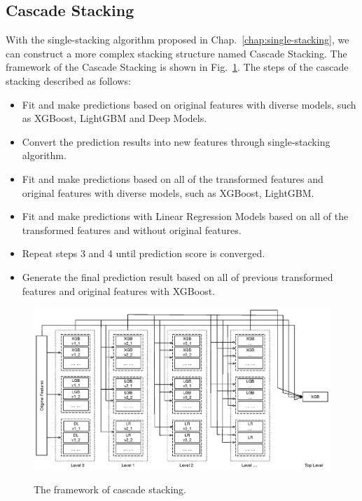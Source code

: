 \documentclass[12pt]{article}
\begin{document}
\subsection{Cascade Stacking}

With the single-stacking algorithm proposed in Chap.~{\ref{chap:single-stacking}}, we can construct a more complex stacking structure named Cascade Stacking. The framework of the Cascade Stacking is shown in Fig.~{\ref{fig:cascade-stacking}}. The steps of the cascade stacking described as follows:

\begin{itemize}
\label{alg:cascade-stacking}
\item[1.] Fit and make predictions based on original features with diverse models, such as XGBoost, LightGBM and Deep Models.
\item[2.] Convert the prediction results into new features through single-stacking algorithm.
\item[3.] Fit and make predictions based on all of the transformed features and original features with diverse models, such as XGBoost, LightGBM.
\item[4.] Fit and make predictions with Linear Regression Models based on all of the transformed features and without original features.
\item[5.] Repeat steps 3 and 4 until prediction score is converged.
\item[6.] Generate the final prediction result based on all of previous transformed features and original features with XGBoost.
\end{itemize}


\begin{figure}[ht]
  \centering
  \includegraphics[width=1.0\textwidth]{../img/cascade-stacking}\\
  \caption{The framework of cascade stacking.}
  \label{fig:cascade-stacking}
\end{figure}
\end{document}
